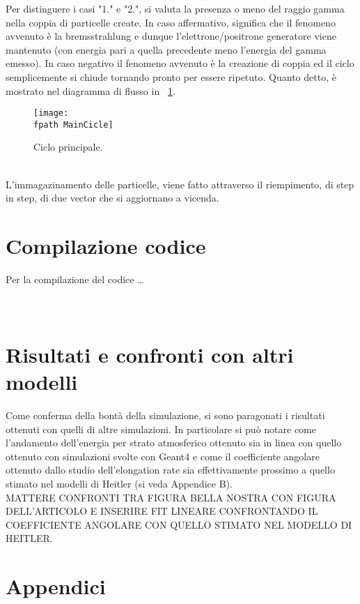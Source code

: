 \documentclass[10pt,a4paper,usenatbib]{article}
\newcommand{\fpath}{./Figs/}
\begin{document}
Per distinguere i casi "1." e "2.", si valuta la presenza o meno del raggio gamma nella coppia di particelle create. In caso affermativo, significa che il fenomeno avvenuto è la bremsstrahlung e dunque l'elettrone/positrone generatore viene mantenuto (con energia pari a quella precedente meno l'energia del gamma emesso). In caso negativo il fenomeno avvenuto è la creazione di coppia ed il ciclo semplicemente si chiude tornando pronto per essere ripetuto. Quanto detto, è mostrato nel diagramma di flusso in \figurename~\ref{\fpath jpg:MainCicle}. 
\begin{figure} [h!]
\centering
\texttt{[image: \\fpath MainCicle]}
\caption{Ciclo principale. }
\label{\fpath jpg:MainCicle}
\end{figure} 
\\L'immagazinamento delle particelle, viene fatto attraverso il riempimento, di step in step, di due vector che si aggiornano a vicenda. 

\section{Compilazione codice}
Per la compilazione del codice \dots \\\\\\

\section{Risultati e confronti con altri modelli}
Come conferma della bontà della simulazione, si sono paragonati i risultati ottenuti con quelli di altre simulazioni. In particolare si può notare come l'andamento dell'energia per strato atmosferico ottenuto sia in linea con quello ottenuto con simulazioni svolte con Geant4 e come il coefficiente angolare ottenuto dallo studio dell'elongation rate sia effettivamente prossimo a quello stimato nel modelli di Heitler (si veda Appendice B). 
\\MATTERE CONFRONTI TRA FIGURA BELLA NOSTRA CON FIGURA DELL'ARTICOLO E INSERIRE FIT LINEARE CONFRONTANDO IL COEFFICIENTE ANGOLARE CON QUELLO STIMATO NEL MODELLO DI HEITLER. 


\pagebreak
\appendix
\section{Appendici}
\end{document}
